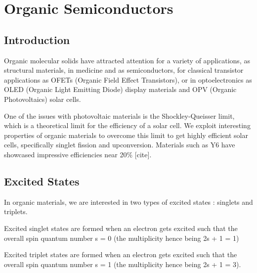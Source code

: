 
\chapter{Organic Semiconductors} %

\label{Chapter2} %


\section{Introduction}

Organic molecular solids have attracted attention for a variety of applications, as structural materials, in medicine and as semiconductors, for classical transistor applications as OFETs (Organic Field Effect Transistors), or in optoelectronics as OLED (Organic Light Emitting Diode) display materials and OPV (Organic Photovoltaics) solar cells.

One of the issues with photovoltaic materials is the Shockley-Queisser limit, which is a theoretical limit for the efficiency of a solar cell. We exploit interesting properties of organic materials to overcome this limit to get highly efficient solar cells, specifically singlet fission and upconversion. Materials such as Y6 have showcased impressive efficiencies near 20\%  [cite].

\section{Excited States}

In organic materials, we are interested in two types of excited states : singlets and triplets. 

Excited singlet states are formed when an electron gets excited such that the overall spin quantum number s = 0 (the multiplicity hence being 2s + 1 = 1)


Excited triplet states are formed when an electron gets excited such that the overall spin quantum number s = 1 (the multiplicity hence being 2s + 1 = 3). 



